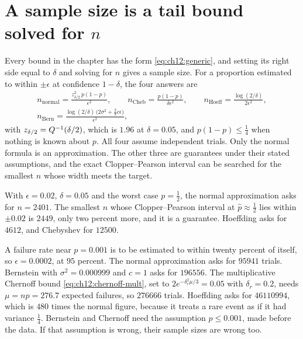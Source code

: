 \section{A sample size is a tail bound solved for \texorpdfstring{$n$}{n}}\label{sec:ch12:samplesize}

Every bound in the chapter has the form \cref{eq:ch12:generic}, and setting its right side equal to $\delta$ and solving for $n$ gives a sample size. For a proportion estimated to within $\pm\epsilon$ at confidence $1-\delta$, the four answers are
\begin{equation}
\begin{gathered}
n_{\text{normal}}=\frac{z_{\delta/2}^2\,p(1-p)}{\epsilon^2},\qquad
n_{\text{Cheb}}=\frac{p(1-p)}{\delta\epsilon^2},\qquad
n_{\text{Hoeff}}=\frac{\log(2/\delta)}{2\epsilon^2},\\
n_{\text{Bern}}=\frac{\log(2/\delta)\,\big(2\sigma^2+\tfrac23c\epsilon\big)}{\epsilon^2},
\end{gathered}
\label{eq:ch12:samplesize}
\end{equation}
with $z_{\delta/2}=Q^{-1}(\delta/2)$, which is $1.96$ at $\delta=0.05$, and $p(1-p)\le\tfrac14$ when nothing is known about $p$. All four assume independent trials. Only the normal formula is an approximation. The other three are guarantees under their stated assumptions, and the exact Clopper--Pearson interval can be searched for the smallest $n$ whose width meets the target.

\begin{example}\label{ex:ch12:twopoints}
With $\epsilon=0.02$, $\delta=0.05$ and the worst case $p=\tfrac12$, the normal approximation asks for $n=2401$. The smallest $n$ whose Clopper--Pearson interval at $\hat p\approx\tfrac12$ lies within $\pm0.02$ is $2449$, only two percent more, and it is a guarantee. Hoeffding asks for $4612$, and Chebyshev for $12500$.
\end{example}

\begin{example}\label{ex:ch12:rare-n}
A failure rate near $p=0.001$ is to be estimated to within twenty percent of itself, so $\epsilon=0.0002$, at $95$ percent. The normal approximation asks for $95941$ trials. Bernstein with $\sigma^2=0.000999$ and $c=1$ asks for $196556$. The multiplicative Chernoff bound \cref{eq:ch12:chernoff-mult}, set to $2e^{-\delta_r^2\mu/3}=0.05$ with $\delta_r=0.2$, needs $\mu=np=276.7$ expected failures, so $276666$ trials. Hoeffding asks for $46110994$, which is $480$ times the normal figure, because it treats a rare event as if it had variance $\tfrac14$. Bernstein and Chernoff need the assumption $p\le0.001$, made before the data. If that assumption is wrong, their sample sizes are wrong too.
\end{example}

